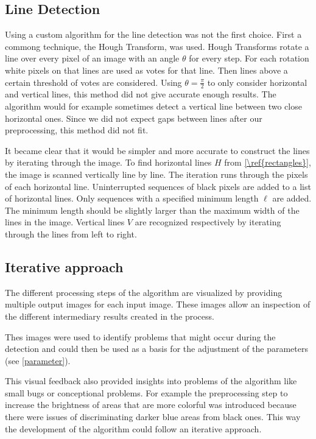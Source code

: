 \documentclass[serif,article,noparskip]{agse-thesis}
\begin{document}
\subsection{Line Detection}

Using a custom algorithm for the line detection was not the first choice. First
a commong technique, the Hough Transform, was used. Hough Transforms rotate a
line over every pixel of an image with an angle $\theta$ for every step. For
each rotation white pixels on that lines are used as votes for that line. Then
lines above a certain threshold of votes are considered. Using $\theta =
\frac{\pi}{2}$ to only consider horizontal and vertical lines, this method did
not give accurate enough results. The algorithm would for example sometimes
detect a vertical line between two close horizontal ones. Since we did not
expect gaps between lines after our preprocessing, this method did not fit.

It became clear that it would be simpler and more accurate to construct the
lines by iterating through the image. To find horizontal lines $H$ from
\ref{\ref{rectangles}}, the image is scanned vertically line by line. The
iteration runs through the pixels of each horizontal line. Uninterrupted
sequences of black pixels are added to a list of horizontal lines. Only
sequences with a specified minimum length $\ell$ are added. The minimum length
should be slightly larger than the maximum width of the lines in the image.
Vertical lines $V$ are recognized respectively by iterating through the lines
from left to right.

\subsection{Iterative approach}

The different processing steps of the algorithm are visualized by providing
multiple output images for each input image. These images allow an inspection
of the different intermediary results created in the process.

Thes images were used to identify problems that might occur during the detection
and could then be used as a basis for the adjustment of the parameters (see
\ref{parameter}).

This visual feedback also provided insights into problems of the algorithm like
small bugs or conceptional problems. For example the preprocessing step to
increase the brightness of areas that are more colorful was introduced because
there were issues of discriminating darker blue areas from black ones. This way
the development of the algorithm could follow an iterative approach.
\end{document}
